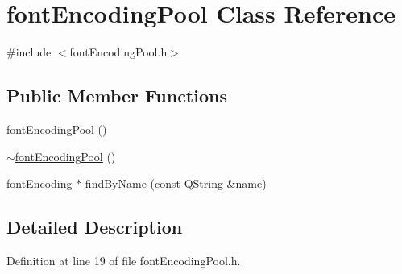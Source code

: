 \hypertarget{classfontEncodingPool}{\section{font\+Encoding\+Pool Class Reference}
\label{classfontEncodingPool}
}


{\ttfamily \#include $<$font\+Encoding\+Pool.\+h$>$}

\subsection*{Public Member Functions}
\begin{DoxyCompactItemize}
\item 
\hyperlink{classfontEncodingPool_a1baece6ca5114214f029775ab6c24cb7}{font\+Encoding\+Pool} ()
\item 
\hyperlink{classfontEncodingPool_a780d4d81cbfd7ecb731de702022291ec}{$\sim$font\+Encoding\+Pool} ()
\item 
\hyperlink{classfontEncoding}{font\+Encoding} $\ast$ \hyperlink{classfontEncodingPool_a28960ca9762af3f188d3e4b247cc1d89}{find\+By\+Name} (const Q\+String \&name)
\end{DoxyCompactItemize}


\subsection{Detailed Description}


Definition at line 19 of file font\+Encoding\+Pool.\+h.



